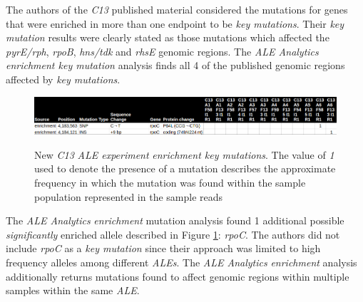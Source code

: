 \documentclass[12pt,final,masters,chapterheads]{ucsd}  %
\begin{document}
The authors of the \textit{C13} published material considered the mutations for genes that were enriched in more than one endpoint to be \textit{key mutations}. Their \textit{key mutation} results were clearly stated as those mutations which affected the \textit{pyrE/rph}, \textit{rpoB}, \textit{hns/tdk} and \textit{rhsE} genomic regions. The\textit{ ALE Analytics} \textit{enrichment key mutation} analysis finds all 4 of the published genomic regions affected by \textit{key mutations}.
\begin{figure}[H]
  \caption{New \textit{C13} \textit{ALE experiment} \textit{enrichment key mutations}. The value of \textit{1} used to denote the presence of a mutation describes the approximate frequency in which the mutation was found within the sample population represented in the sample reads \cite{breseq_paper}}
  \centering
  \includegraphics[width=\textwidth]{c13_new_enrich_muts.png}
  \label{fig:c13_new_enrich_muts}
\end{figure}
The \textit{ALE Analytics} \textit{enrichment} mutation analysis found 1 additional possible \textit{significantly} enriched allele described in Figure \ref{fig:c13_new_enrich_muts}: \textit{rpoC}. The authors did not include \textit{rpoC} as a \textit{key mutation} since their approach was limited to high frequency alleles among different \textit{ALEs}. The \textit{ALE Analytics} \textit{enrichment} analysis additionally returns mutations found to affect genomic regions within multiple samples within the same \textit{ALE}.
\end{document}
